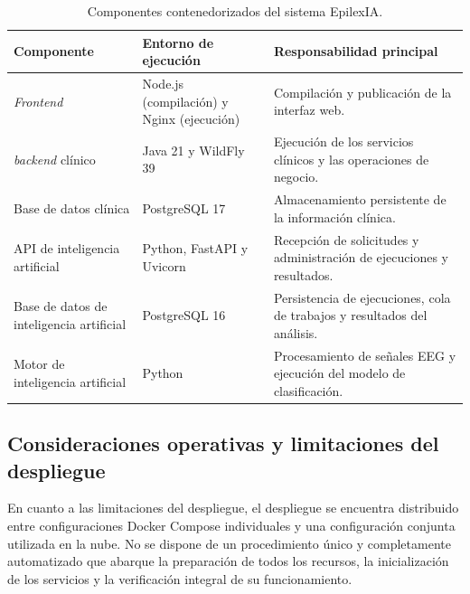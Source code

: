 \begin{table}[htbp]
    \centering
    \caption{Componentes contenedorizados del sistema EpilexIA.}
    \label{tab:componentes-contenedorizados}
    \small
    \begin{tabularx}{\textwidth}{|
        >{\raggedright\arraybackslash}p{}|
        >{\raggedright\arraybackslash}p{}|
        >{\raggedright\arraybackslash}X|}
        \hline
        \textbf{Componente} &
        \textbf{Entorno de ejecución} &
        \textbf{Responsabilidad principal} \\
        \hline

        \textit{Frontend} &
        Node.js (compilación) y Nginx (ejecución) &
        Compilación y publicación de la interfaz web. \\
        \hline

        \textit{backend} clínico &
        Java 21 y WildFly 39 &
        Ejecución de los servicios clínicos y las operaciones de negocio. \\
        \hline

        Base de datos clínica &
        PostgreSQL 17 &
        Almacenamiento persistente de la información clínica. \\
        \hline

        API de inteligencia artificial &
        Python, FastAPI y Uvicorn &
        Recepción de solicitudes y administración de ejecuciones y resultados. \\
        \hline

        Base de datos de inteligencia artificial &
        PostgreSQL 16 &
        Persistencia de ejecuciones, cola de trabajos y resultados del análisis. \\
        \hline

        Motor de inteligencia artificial &
        Python &
        Procesamiento de señales EEG y ejecución del modelo de clasificación. \\
        \hline
    \end{tabularx}
\end{table}

\subsection[Consideraciones operativas y limitaciones del despliegue]{Consideraciones operativas y limitaciones del \\despliegue}

En cuanto a las limitaciones del despliegue, el despliegue se encuentra distribuido entre
configuraciones Docker Compose individuales y una configuración conjunta utilizada en la nube.
No se dispone de un procedimiento único y completamente automatizado que abarque la preparación de todos los recursos, la inicialización de los servicios y la verificación integral de su funcionamiento.

